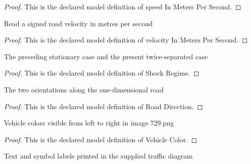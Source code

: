\begin{proof}
  This is the declared model definition of speed In Meters Per Second.
\end{proof}
\begin{definition}
  \label{def:physics:phyx-mini-0729:phyxminiproblems-problemphyxmini0729-velocityinmeterspersecond}
  Read a signed road velocity in metres per second
\end{definition}
\begin{proof}
  This is the declared model definition of velocity In Meters Per Second.
\end{proof}
\begin{definition}
  \label{def:physics:phyx-mini-0729:phyxminiproblems-problemphyxmini0729-shockregime}
  The preceding stationary case and the present twice-separated case
\end{definition}
\begin{proof}
  This is the declared model definition of Shock Regime.
\end{proof}
\begin{definition}
  \label{def:physics:phyx-mini-0729:phyxminiproblems-problemphyxmini0729-roaddirection}
  The two orientations along the one-dimensional road
\end{definition}
\begin{proof}
  This is the declared model definition of Road Direction.
\end{proof}
\begin{definition}
  \label{def:physics:phyx-mini-0729:phyxminiproblems-problemphyxmini0729-vehiclecolor}
  Vehicle colors visible from left to right in image 729.png
\end{definition}
\begin{proof}
  This is the declared model definition of Vehicle Color.
\end{proof}
\begin{definition}
  \label{def:physics:phyx-mini-0729:phyxminiproblems-problemphyxmini0729-trafficfigurelabel}
  Text and symbol labels printed in the supplied traffic diagram
\end{definition}
